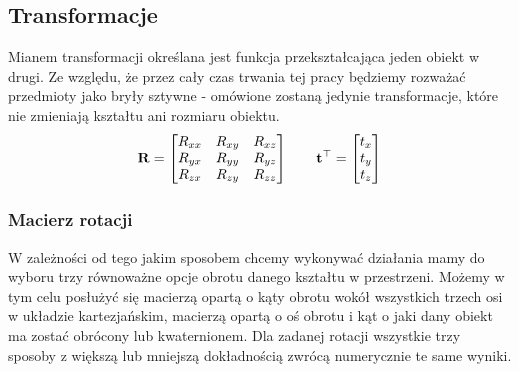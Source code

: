 \documentclass{article}
\begin{document}
\subsection*{\LARGE{Transformacje}} 

Mianem transformacji określana jest funkcja przekształcająca jeden obiekt w drugi. Ze względu, że przez cały czas trwania tej pracy będziemy rozważać przedmioty jako bryły sztywne - omówione zostaną jedynie transformacje, które nie zmieniają kształtu ani rozmiaru obiektu. 
\[
\mathbf{R} = \begin{bmatrix}
R_{xx} & R_{xy} & R_{xz} \\
R_{yx} & R_{yy} & R_{yz} \\
R_{zx} & R_{zy} & R_{zz}
\end{bmatrix}
\qquad
\vb{t}^\top = \begin{bmatrix}
t_{x} \\ t_{y} \\ t_{z}
\end{bmatrix}
\]

\subsubsection*{\Large{Macierz rotacji}}
W zależności od tego jakim sposobem chcemy wykonywać działania mamy do wyboru trzy równoważne opcje obrotu danego kształtu w przestrzeni. Możemy w tym celu posłużyć się macierzą opartą o kąty obrotu wokół wszystkich trzech osi w układzie kartezjańskim, macierzą opartą o oś obrotu i kąt o jaki dany obiekt ma zostać obrócony lub kwaternionem. Dla zadanej rotacji wszystkie trzy sposoby z większą lub mniejszą dokładnością zwrócą numerycznie te same wyniki.
\end{document}
